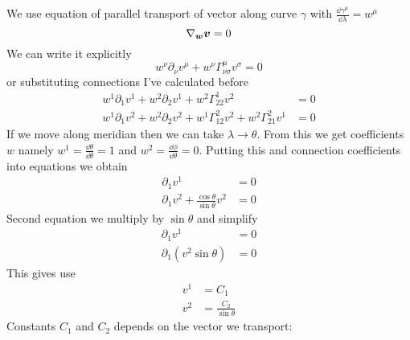 We use equation of parallel transport of vector  along curve $\gamma$ with
$\frac{\dd \gamma^\mu}{\dd \lambda} = w^\mu$
%
\begin{equation}
    \nabla_{\boldsymbol{w}} \boldsymbol{v} = 0
\end{equation}
%
We can write it explicitly
%
\begin{equation}
    w^\nu \partial_\nu v^\mu + w^\nu \Gamma^\mu_{\nu\sigma} v^\sigma = 0
\end{equation}
%
or substituting connections I've calculated before
%
\begin{subequations}
    \begin{align}
        w^1 \partial_1 v^1 + w^2 \partial_2 v^1 + w^2 \Gamma^1_{22} v^2                         & = 0 \\
        w^1 \partial_1 v^2 + w^2 \partial_2 v^2 + w^1 \Gamma^2_{12} v^2 + w^2 \Gamma^2_{21} v^1 & = 0
    \end{align}
\end{subequations}
%
If we move along meridian then we can take $\lambda \rightarrow \theta$. From
this we get coefficients $w$ namely $w^1 = \frac{\dd \theta}{\dd \theta} = 1$
and $w^2 = \frac{\dd \phi}{\dd \theta} = 0$. Putting this and connection
coefficients into equations we obtain
%
\begin{subequations}
    \begin{align}
        \partial_1 v^1                                     & = 0 \\
        \partial_1 v^2 + \frac{\cos\theta}{\sin\theta} v^2 & = 0
    \end{align}
\end{subequations}
%
Second equation we multiply by $\sin\theta$ and simplify
%
\begin{subequations}
    \begin{align}
        \partial_1 v^1                        & = 0 \\
        \partial_1 \left(v^2\sin\theta\right) & = 0
    \end{align}
\end{subequations}
%
This gives use
%
\begin{subequations}
    \begin{align}
        v^1 & = C_1                    \\
        v^2 & = \frac{C_2}{\sin\theta}
    \end{align}
\end{subequations}
%
Constants $C_1$ and $C_2$ depends on the vector we transport:
